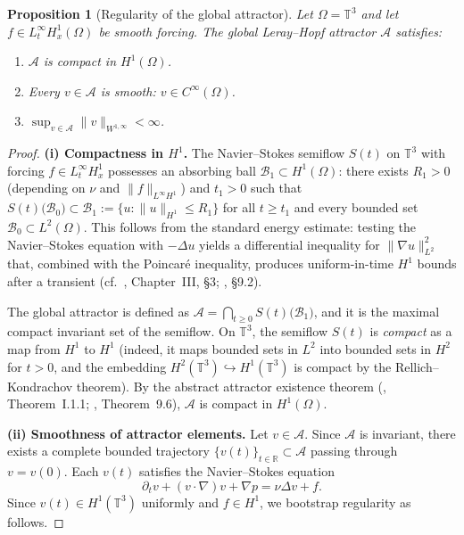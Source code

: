 \documentclass[12pt,a4paper]{article}
\theoremstyle{definition}
\theoremstyle{plain}
\newtheorem{proposition}[definition]{Proposition}
\theoremstyle{remark}
\begin{document}
\begin{proposition}[Regularity of the global attractor]
\label{prop:attractor-regularity}
Let $\Omega = \mathbb{T}^3$ and let $f \in L^\infty_t H^1_x(\Omega)$ be smooth
forcing.  The global Leray--Hopf attractor $\mathcal{A}$ satisfies:
\begin{enumerate}
    \item[\emph{(i)}]   $\mathcal{A}$ is compact in $H^1(\Omega)$.
    \item[\emph{(ii)}]  Every $v \in \mathcal{A}$ is smooth: $v \in C^\infty(\Omega)$.
    \item[\emph{(iii)}] $\sup_{v \in \mathcal{A}} \|v\|_{W^{1,\infty}} < \infty$.
\end{enumerate}
\end{proposition}

\begin{proof}
\noindent\textbf{(i) Compactness in $H^1$.}
The Navier--Stokes semiflow $S(t)$ on $\mathbb{T}^3$ with forcing
$f \in L^\infty_t H^1_x$ possesses an absorbing ball
$\mathcal{B}_1 \subset H^1(\Omega)$: there exists $R_1 > 0$ (depending on
$\nu$ and $\|f\|_{L^\infty H^1}$) and $t_1 > 0$ such that
$S(t)\bigl(\mathcal{B}_0\bigr) \subset \mathcal{B}_1 := \{u : \|u\|_{H^1} \le R_1\}$
for all $t \ge t_1$ and every bounded set $\mathcal{B}_0 \subset L^2(\Omega)$.
This follows from the standard energy estimate: testing the Navier--Stokes
equation with $-\Delta u$ yields a differential inequality for $\|\nabla u\|_{L^2}^2$
that, combined with the Poincar\'{e} inequality, produces uniform-in-time $H^1$
bounds after a transient (cf.\ \cite{Temam2001}, Chapter~III, \S3;
\cite{FoiasManleyRosaTemam2001}, \S9.2).

The global attractor is defined as
$\mathcal{A} = \bigcap_{t\ge 0} S(t)\bigl(\mathcal{B}_1\bigr)$, and it is the
maximal compact invariant set of the semiflow.  On $\mathbb{T}^3$, the semiflow
$S(t)$ is \emph{compact} as a map from $H^1$ to $H^1$ (indeed, it maps bounded
sets in $L^2$ into bounded sets in $H^2$ for $t > 0$, and the embedding
$H^2(\mathbb{T}^3) \hookrightarrow H^1(\mathbb{T}^3)$ is compact by the
Rellich--Kondrachov theorem).  By the abstract attractor existence theorem
(\cite{Temam2001}, Theorem~I.1.1; \cite{FoiasManleyRosaTemam2001}, Theorem~9.6),
$\mathcal{A}$ is compact in $H^1(\Omega)$.

\medskip
\noindent\textbf{(ii) Smoothness of attractor elements.}
Let $v \in \mathcal{A}$.  Since $\mathcal{A}$ is invariant, there exists a
complete bounded trajectory $\{v(t)\}_{t\in\mathbb{R}} \subset \mathcal{A}$
passing through $v = v(0)$.  Each $v(t)$ satisfies the Navier--Stokes equation
\[
    \partial_t v + (v\cdot\nabla)v + \nabla p = \nu\Delta v + f.
\]
Since $v(t) \in H^1(\mathbb{T}^3)$ uniformly and $f \in H^1$, we bootstrap
regularity as follows.


\end{proof}
\end{document}
